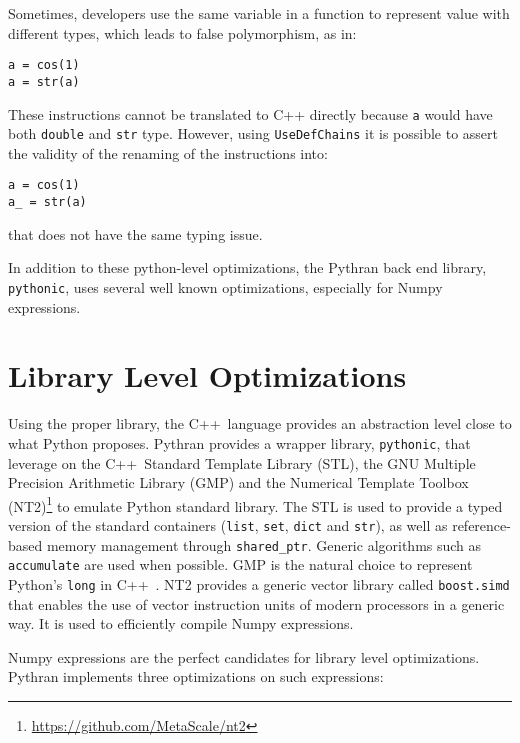 \documentclass[10pt, onecolumn, preprint]{sigplanconf}
\providecommand{\cpp}[1][~]{\textsc{C++}#1}
\begin{document}
Sometimes, developers use the same variable in a function to represent value 
with different types, which leads to false polymorphism, as in:

\begin{lstlisting}
a = cos(1)
a = str(a)
\end{lstlisting}

These instructions cannot be translated to C++ directly because \texttt{a}
would have both \texttt{double} and \texttt{str} type. However, using
\texttt{UseDefChains} it is possible to assert the validity of the renaming of
the instructions into:


\begin{lstlisting}
a = cos(1)
a_ = str(a)
\end{lstlisting}

that does not have the same typing issue.

In addition to these python-level optimizations, the Pythran back end library,
\texttt{pythonic}, uses several well known optimizations, especially for Numpy
expressions.

\section{Library Level Optimizations}
\label{sec:backend}

Using the proper library, the \cpp language provides an abstraction level close
to what Python proposes. Pythran provides a wrapper library, \texttt{pythonic},
that leverage on the \cpp Standard Template Library (STL), the GNU Multiple
Precision Arithmetic Library (GMP) and the Numerical Template Toolbox
(NT2)\footnote{\url{https://github.com/MetaScale/nt2}} to emulate Python
standard library. The STL is used to provide a typed version of the standard
containers (\texttt{list}, \texttt{set}, \texttt{dict} and \texttt{str}), as
well as reference-based memory management through \texttt{shared\_ptr}. Generic
algorithms such as \texttt{accumulate} are used when possible. GMP is the
natural choice to represent Python's \texttt{long} in \cpp. NT2 provides a generic
vector library called \texttt{boost.simd}\cite{esterie2012boost} that enables
the use of vector instruction units of modern processors in a generic way. It is used
to efficiently compile Numpy expressions.

Numpy expressions are the perfect candidates for library level optimizations.
Pythran implements three optimizations on such expressions:
\end{document}
